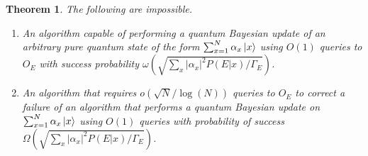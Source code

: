 \documentclass[aps,amsmath,onecolumn,amssymb]{revtex4}
\newtheorem{theorem}{Theorem}
\begin{document}
\begin{theorem}
The following are impossible.
\begin{enumerate}
\item An algorithm capable of performing a quantum Bayesian update of an arbitrary pure quantum state of the form $\sum_{x=1}^N \alpha_x \left|x\right\rangle$ using $O(1)$ queries to $O_E$ with success probability $\omega(\sqrt{\sum_x |\alpha_x|^2 P(E|x)/\Gamma_E})$.
\item An algorithm that requires $o(\sqrt{N}/\log(N))$ queries to $O_E$ to correct a failure of an algorithm that performs a quantum Bayesian update on $\sum_{x=1}^N \alpha_x \left|x\right\rangle$ using $O(1)$ queries with probability of success $\Omega(\sqrt{\sum_x |\alpha_x|^2 P(E|x)/\Gamma_E})$.
\end{enumerate}
\end{theorem}
\end{document}
